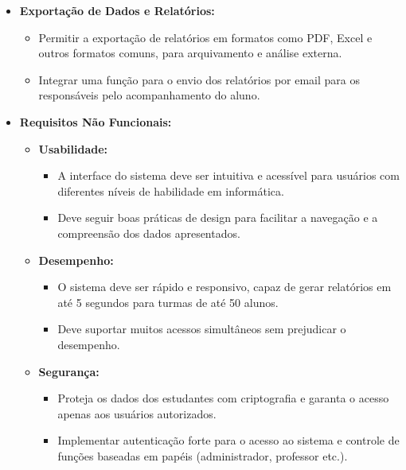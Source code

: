 \begin{enumerate}[label=\arabic*)]
\begin{itemize}[leftmargin=2em]
\begin{itemize}
            \item \textbf{Exportação de Dados e Relatórios:}
            \begin{itemize}
                \item Permitir a exportação de relatórios em formatos como PDF, Excel e outros formatos comuns, para arquivamento e análise externa.
                \item Integrar uma função para o envio dos relatórios por email para os responsáveis ​​pelo acompanhamento do aluno.
            \end{itemize}
        \end{itemize}
    \end{itemize}\begin{itemize}[leftmargin=2em]
        \item \textbf{Requisitos Não Funcionais:}
        \begin{itemize}[leftmargin=2em]
            \item \textbf{Usabilidade:}
            \begin{itemize}[leftmargin=2em]
                \item A interface do sistema deve ser intuitiva e acessível para usuários com diferentes níveis de habilidade em informática.
                \item Deve seguir boas práticas de design para facilitar a navegação e a compreensão dos dados apresentados.
            \end{itemize}
    
            \item \textbf{Desempenho:}
            \begin{itemize}[leftmargin=2em]
                \item O sistema deve ser rápido e responsivo, capaz de gerar relatórios em até 5 segundos para turmas de até 50 alunos.
                \item Deve suportar muitos acessos simultâneos sem prejudicar o desempenho.
            \end{itemize}
    
            \item \textbf{Segurança:}
            \begin{itemize}[leftmargin=2em]
                \item Proteja os dados dos estudantes com criptografia e garanta o acesso apenas aos usuários autorizados.
                \item Implementar autenticação forte para o acesso ao sistema e controle de funções baseadas em papéis (administrador, professor etc.).
            \end{itemize}
    

\end{itemize}
\end{itemize}
\end{enumerate}
